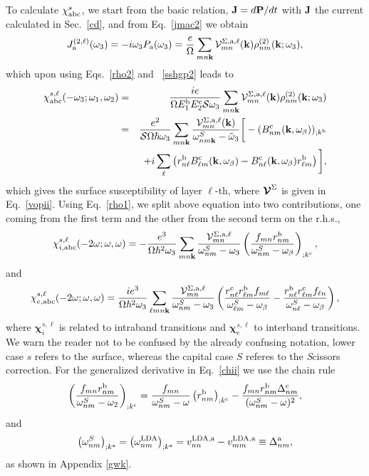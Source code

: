 \documentclass[floatfix,prb,aps,superscriptaddress,11pt,preprint]{revtex4}
\begin{document}
To calculate $\chi_{\mathrm{a}\mathrm{b}\mathrm{c}}^s$,
we start from the basic relation, $\mathbf{J}=d\mathbf{P}/dt$ 
with $\mathbf{J}$ the current calculated in Sec.~\ref{cd}, and
from Eq.~\eqref{jmac2} we obtain
\begin{equation}\label{Pjikn}
J_{\mathrm{a}}^{(2,\ell)}(\omega_3)=-i\omega_3P_{\mathrm{a}}(\omega_3)
=\frac{e}{\Omega}
\sum_{mn\mathbf{k}}
{\mathbf{\cal V}}^{\Sigma,\mathrm{a},\ell}_{mn}(\mathbf{k})
\rho^{(2)}_{nm}(\mathbf{k};\omega_3)
,
\end{equation}
which upon using Eqs.~\eqref{rho2} and ~\eqref{sshgp2} leads to
\begin{eqnarray}\label{Pjikn2}
\chi^{s,\ell}_{\mathrm{a}\mathrm{b}\mathrm{c}}(-\omega_3;\omega_1,\omega_2)
&=&
\frac{ie}{\Omega E^{\mathrm{b}}_1E^{\mathrm{c}}_2{\cal S} \omega_3}
\sum_{mn\mathbf{k}}
{\mathbf{\cal V}}^{\Sigma,\mathrm{a},\ell}_{mn}(\mathbf{k})
\rho^{(2)}_{nm}(\mathbf{k};\omega_3)
\nonumber \\
&=&
\frac{e^2}{{\cal S}\Omega\hbar\omega_3}
\sum_{mn\mathbf{k}}
\frac{{\mathbf{\cal V}}^{\Sigma,\mathrm{a},\ell}_{mn}(\mathbf{k})}
{\omega^S_{nm\mathbf{k}}-\tilde\omega_3}
\bigg[
-(B_{nm}^{\mathrm{c}}(\mathbf{k},\omega_\beta))_{;k^{\mathrm{b}}}
\nonumber \\
&&
+i\sum_\ell\left(r_{n\ell}^{\mathrm{b}}B_{\ell m}^{\mathrm{c}}(\mathbf{k},\omega_\beta) -
  B_{n\ell}^{\mathrm{c}}(\mathbf{k},\omega_\beta) 
  r_{\ell m}^{\mathrm{b}}\right)
\bigg]
,
\end{eqnarray}
which gives the surface susceptibility of layer $\ell$-th, where 
$\boldsymbol{\mathcal{\cal V}}^\Sigma$ is given in Eq.~\eqref{vopii}.
Using Eq.~\eqref{rho1}, we
split above equation into
two contributions, one coming from the first term and the other
from the second term on the r.h.s.,
\begin{equation}\label{chii}
\chi_{i,\mathrm{a}\mathrm{b}\mathrm{c}}^{s,\ell}
(-2\omega;\omega,\omega)
=-\frac{e^3}{\Omega\hbar^2\omega_3}\sum_{mn\mathbf{k}}
\frac{{\mathbf{\cal V}}_{mn}^{\Sigma,\mathrm{a},\ell}}{\omega^S_{nm}-\omega_3}
\left(\frac{f_{mn}r_{nm}^{\mathrm{b}}}{\omega^S_{nm}-\omega_\beta}\right)_{;k^{\mathrm{c}}},
\end{equation} 
and
\begin{equation}\label{chie}
\chi_{e,\mathrm{a}\mathrm{b}\mathrm{c}}^{s,\ell}
(-2\omega;\omega,\omega)
=\frac{ie^3}{\Omega\hbar^2\omega_3}\sum_{\ell mn\mathbf{k}}
\frac{{\mathbf{\cal V}}_{mn}^{\Sigma,\mathrm{a},\ell}}{\omega^S_{nm}-\omega_3}
\left(
\frac{r_{n\ell}^{\mathrm{c}} r_{\ell m}^{\mathrm{b}} 
f_{m\ell}}{\omega^S_{\ell m}-\omega_\beta}
-\frac{r_{n\ell}^{\mathrm{b}} r_{\ell m}^{\mathrm{c}} 
f_{\ell n}}{\omega^S_{n \ell}-\omega_\beta}
\right),
\end{equation} 
where $\boldsymbol{\chi}^{s,\ell}_i$
 is related to intraband transitions and
$\boldsymbol{\chi}^{s,\ell}_e$
to interband transitions. We warn the reader not to be confused by the
already confusing notation, lower case $s$ refers to the 
{\it s}urface, whereas the capital case $S$ referes to the {\it S}cissors correction.   
For the generalized derivative in Eq.~\eqref{chii} we use the chain rule 
\begin{equation}\label{gene2}
\left(\frac{f_{mn}r_{nm}^{\mathrm{b}}}{\omega^S_{nm}-\omega_2}\right)_{;k^{\mathrm{c}}}=
\frac{f_{mn}}{\omega^S_{nm}-\omega}\left(r_{nm}^{\mathrm{b}}\right)_{;k^{\mathrm{c}}}
-\frac{f_{mn}r_{nm}^{\mathrm{b}}\Delta_{nm}^{\mathrm{c}}}{(\omega^S_{nm}-\omega)^2}
,
\end{equation}
and 
\begin{equation}\label{eli.13}
\left(\omega^S_{nm}\right)_{;k^{\mathrm{a}}}
=
\left(\omega^{\mathrm{LDA}}_{nm}\right)_{;k^{\mathrm{a}}}
=
v_{nn}^{\mathrm{LDA},\mathrm{a}}-v_{mm}^{\mathrm{LDA},\mathrm{a}}\equiv\Delta_{nm}^{\mathrm{a}}
,
\end{equation}
as shown in Appendix \ref{gwk}. 
\end{document}
